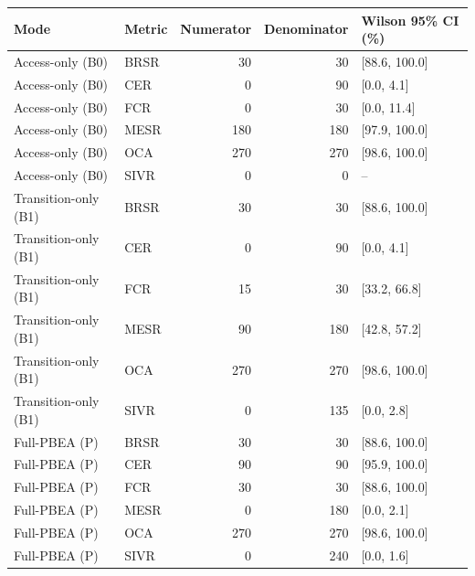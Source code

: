 \begin{tabular}{llrrl}
\toprule
Mode & Metric & Numerator & Denominator & Wilson 95\% CI (\%) \\
\midrule
Access-only (B0) & BRSR & 30 & 30 & [88.6, 100.0] \\
Access-only (B0) & CER & 0 & 90 & [0.0, 4.1] \\
Access-only (B0) & FCR & 0 & 30 & [0.0, 11.4] \\
Access-only (B0) & MESR & 180 & 180 & [97.9, 100.0] \\
Access-only (B0) & OCA & 270 & 270 & [98.6, 100.0] \\
Access-only (B0) & SIVR & 0 & 0 & -- \\
Transition-only (B1) & BRSR & 30 & 30 & [88.6, 100.0] \\
Transition-only (B1) & CER & 0 & 90 & [0.0, 4.1] \\
Transition-only (B1) & FCR & 15 & 30 & [33.2, 66.8] \\
Transition-only (B1) & MESR & 90 & 180 & [42.8, 57.2] \\
Transition-only (B1) & OCA & 270 & 270 & [98.6, 100.0] \\
Transition-only (B1) & SIVR & 0 & 135 & [0.0, 2.8] \\
Full-PBEA (P) & BRSR & 30 & 30 & [88.6, 100.0] \\
Full-PBEA (P) & CER & 90 & 90 & [95.9, 100.0] \\
Full-PBEA (P) & FCR & 30 & 30 & [88.6, 100.0] \\
Full-PBEA (P) & MESR & 0 & 180 & [0.0, 2.1] \\
Full-PBEA (P) & OCA & 270 & 270 & [98.6, 100.0] \\
Full-PBEA (P) & SIVR & 0 & 240 & [0.0, 1.6] \\
\bottomrule
\end{tabular}
